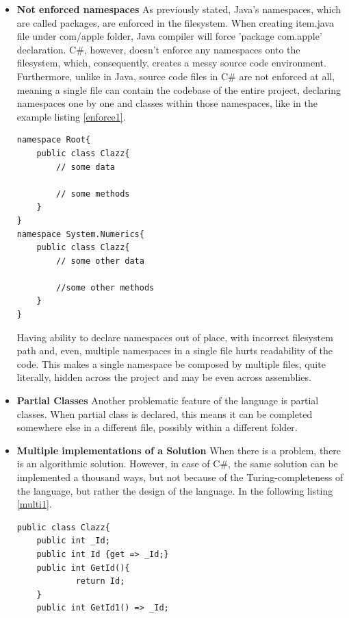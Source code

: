 \documentclass{article}
\begin{document}
\begin{itemize}
    \item \textbf{Not enforced namespaces} \newline
          As previously stated, Java's namespaces, which are called packages, are enforced in the filesystem. When creating item.java file under com/apple folder, Java compiler will force 'package com.apple' declaration.
          C\#, however, doesn't enforce any namespaces onto the filesystem, which, consequently, creates a messy source code environment. Furthermore, unlike in Java, source code files in C\# are not enforced at all, meaning a single file can contain the codebase of the entire project, declaring namespaces one by one and classes within those namespaces, like in the example listing \ref*{enforce1}.
          \begin{lstlisting}[frame=single, label=enforce1, caption=Example File thisisok.cs]
namespace Root{
    public class Clazz{
        // some data

        // some methods
    }
}
namespace System.Numerics{
    public class Clazz{
        // some other data

        //some other methods
    }
}
            \end{lstlisting}
            Having ability to declare namespaces out of place, with incorrect filesystem path and, even, multiple namespaces in a single file hurts readability of the code. This makes a single namespace be composed by multiple files, quite literally, hidden across the project and may be even across assemblies.
    \item \textbf{Partial Classes} \newline
          Another problematic feature of the language is partial classes. When partial class is declared, this means it can be completed somewhere else in a different file, possibly within a different folder. 
    \item \textbf{Multiple implementations of a Solution} \newline
          When there is a problem, there is an algorithmic solution. However, in case of C\#, the same solution can be implemented a thousand ways, but not because of the Turing-completeness of the language, but rather the design of the language. In the following listing \ref*{multi1}.
          \begin{lstlisting}[frame=single, label=multi1, caption=Example C\# File notok.cs]
public class Clazz{
    public int _Id;
    public int Id {get => _Id;}
    public int GetId(){
            return Id;
    }
    public int GetId1() => _Id;


\end{lstlisting}
\end{itemize}
\end{document}

